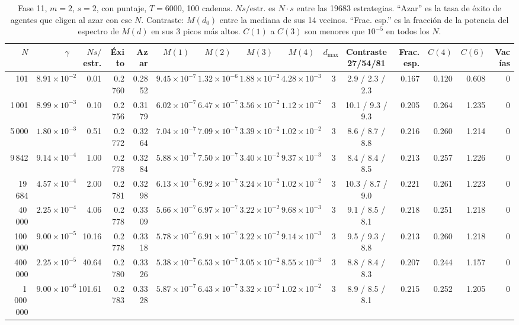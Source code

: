 \documentclass[11pt,letterpaper]{article}
\begin{document}
\begin{table}[H]
\centering
\scriptsize
\setlength{\tabcolsep}{3.5pt}
\caption{Fase 11, $m=2$, $s=2$, con puntaje, $T=6000$, 100 cadenas. $N s/\text{estr.}$ es $N\cdot s$ entre las 19683 estrategias. ``Azar'' es la tasa de éxito de agentes que eligen al azar con ese $N$. Contraste: $M(d_0)$ entre la mediana de sus 14 vecinos. ``Frac. esp.'' es la fracción de la potencia del espectro de $M(d)$ en sus 3 picos más altos. $C(1)$ a $C(3)$ son menores que $10^{-5}$ en todos los $N$.}\label{tab:f11}
\begin{adjustbox}{max width=\textwidth}
\begin{tabular}{rrrrrrrrrrcrrrr}
\toprule
$N$ & $\gamma$ & $Ns/$estr. & Éxito & Azar & $M(1)$ & $M(2)$ & $M(3)$ & $M(4)$ & $d_{\max}$ & Contraste 27/54/81 & Frac. esp. & $C(4)$ & $C(6)$ & Vacías \\
\midrule
101 & $8.91\times10^{-2}$ & 0.01 & 0.2760 & 0.2852 & $9.45\times10^{-7}$ & $1.32\times10^{-6}$ & $1.88\times10^{-2}$ & $4.28\times10^{-3}$ & 3 & 2.9 / 2.3 / 2.3 & 0.167 & 0.120 & 0.608 & 0 \\
1\,001 & $8.99\times10^{-3}$ & 0.10 & 0.2756 & 0.3179 & $6.02\times10^{-7}$ & $6.47\times10^{-7}$ & $3.56\times10^{-2}$ & $1.12\times10^{-2}$ & 3 & 10.1 / 9.3 / 9.3 & 0.205 & 0.264 & 1.235 & 0 \\
5\,000 & $1.80\times10^{-3}$ & 0.51 & 0.2772 & 0.3264 & $7.04\times10^{-7}$ & $7.09\times10^{-7}$ & $3.39\times10^{-2}$ & $1.02\times10^{-2}$ & 3 & 8.6 / 8.7 / 8.8 & 0.216 & 0.260 & 1.214 & 0 \\
9\,842 & $9.14\times10^{-4}$ & 1.00 & 0.2778 & 0.3284 & $5.88\times10^{-7}$ & $7.50\times10^{-7}$ & $3.40\times10^{-2}$ & $9.37\times10^{-3}$ & 3 & 8.4 / 8.4 / 8.5 & 0.213 & 0.257 & 1.226 & 0 \\
19\,684 & $4.57\times10^{-4}$ & 2.00 & 0.2781 & 0.3298 & $6.13\times10^{-7}$ & $6.92\times10^{-7}$ & $3.24\times10^{-2}$ & $1.02\times10^{-2}$ & 3 & 10.3 / 8.7 / 9.0 & 0.221 & 0.261 & 1.223 & 0 \\
40\,000 & $2.25\times10^{-4}$ & 4.06 & 0.2778 & 0.3309 & $5.66\times10^{-7}$ & $6.97\times10^{-7}$ & $3.22\times10^{-2}$ & $9.68\times10^{-3}$ & 3 & 9.1 / 8.5 / 8.1 & 0.218 & 0.251 & 1.218 & 0 \\
100\,000 & $9.00\times10^{-5}$ & 10.16 & 0.2778 & 0.3318 & $5.78\times10^{-7}$ & $6.91\times10^{-7}$ & $3.22\times10^{-2}$ & $9.14\times10^{-3}$ & 3 & 9.5 / 9.3 / 8.8 & 0.213 & 0.260 & 1.218 & 0 \\
400\,000 & $2.25\times10^{-5}$ & 40.64 & 0.2780 & 0.3326 & $5.38\times10^{-7}$ & $6.53\times10^{-7}$ & $3.05\times10^{-2}$ & $8.55\times10^{-3}$ & 3 & 8.8 / 8.4 / 8.3 & 0.207 & 0.244 & 1.157 & 0 \\
1\,000\,000 & $9.00\times10^{-6}$ & 101.61 & 0.2783 & 0.3328 & $5.87\times10^{-7}$ & $6.43\times10^{-7}$ & $3.32\times10^{-2}$ & $1.02\times10^{-2}$ & 3 & 8.9 / 8.5 / 8.1 & 0.215 & 0.252 & 1.205 & 0 \\
\bottomrule
\end{tabular}
\end{adjustbox}
\end{table}
\end{document}

